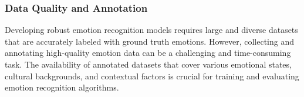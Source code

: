 \subsubsection{ Data Quality and Annotation}
Developing robust emotion recognition models requires large and diverse datasets that are accurately labeled with ground truth emotions.
However, collecting and annotating high-quality emotion data can be a challenging and time-consuming task. 
The availability of annotated datasets that cover various emotional states, cultural backgrounds,
and contextual factors is crucial for training and evaluating emotion recognition algorithms.